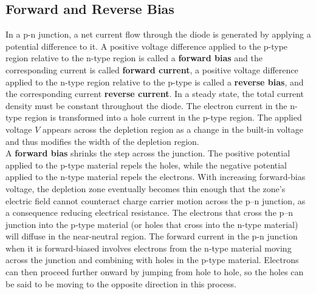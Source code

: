 \documentclass[main]{subfiles}
\begin{document}
\subsection{Forward and Reverse Bias}

In a p-n junction, a net current flow through the diode is generated by applying a potential difference to it. A positive voltage difference applied to the p-type region relative to the n-type region is called a \textbf{forward bias} and the corresponding current is called \textbf{forward current}, a positive voltage difference applied to the n-type region relative to the p-type is called a \textbf{reverse bias}, and the corresponding current \textbf{reverse current}. In a steady state, the total current density must be constant throughout the diode. The electron current in the n-type region is transformed into a hole current in the p-type region. The applied voltage \(V\) appears across the depletion region as a change in the built-in voltage and thus modifies the width of the depletion region.\\
A \textbf{forward bias} shrinks the step across the junction. The positive potential applied to the p-type material repels the holes, while the negative potential applied to the n-type material repels the electrons. With increasing forward-bias voltage, the depletion zone eventually becomes thin enough that the zone's electric field cannot counteract charge carrier motion across the p–n junction, as a consequence reducing electrical resistance. The electrons that cross the p–n junction into the p-type material (or holes that cross into the n-type material) will diffuse in the near-neutral region. The forward current in the p-n junction when it is forward-biased involves electrons from the n-type material moving across the junction and combining with holes in the p-type material. Electrons can then proceed further onward by jumping from hole to hole, so the holes can be said to be moving to the opposite direction in this process.
\end{document}
